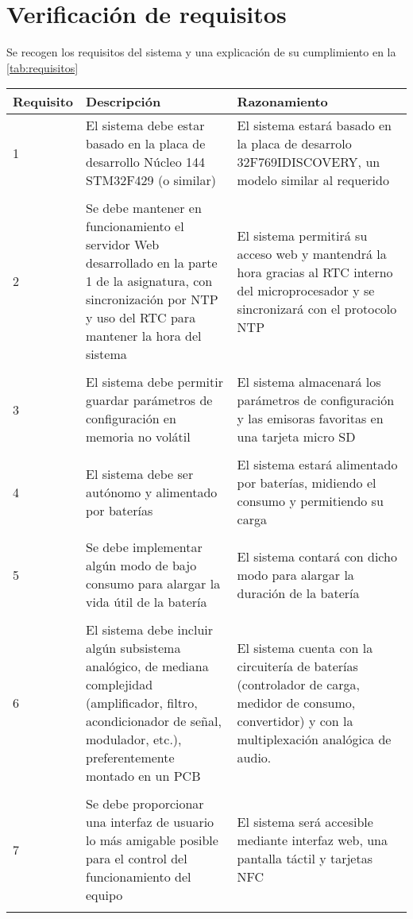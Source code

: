 \section{Verificación de requisitos}

Se recogen los requisitos del sistema y una explicación de su cumplimiento en la \autoref{tab:requisitos}

\begin{longtable}{l p{5cm} p{5cm}}
    \toprule
    \textbf{Requisito} & \textbf{Descripción} & \textbf{Razonamiento} \\ \midrule
    1 & El sistema debe estar basado en la placa de desarrollo Núcleo 144 STM32F429 (o similar) & El sistema estará basado en la placa de desarrolo 32F769IDISCOVERY, un modelo similar al requerido \\ \\
    2 & Se debe mantener en funcionamiento el servidor Web desarrollado en la parte 1 de la asignatura, con sincronización por NTP y uso del RTC para mantener la hora del sistema & El sistema permitirá su acceso web y mantendrá la hora gracias al RTC interno del microprocesador y se sincronizará con el protocolo NTP \\ \\
    3 & El sistema debe permitir guardar parámetros de configuración en memoria no volátil & El sistema almacenará los parámetros de configuración y las emisoras favoritas en una tarjeta micro SD \\ \\
    4 & El sistema debe ser autónomo y alimentado por baterías & El sistema estará alimentado por baterías, midiendo el consumo y permitiendo su carga \\ \\
    5 & Se debe implementar algún modo de bajo consumo para alargar la vida útil de la batería & El sistema contará con dicho modo para alargar la duración de la batería \\ \\
    6 & El sistema debe incluir algún subsistema analógico, de mediana complejidad (amplificador, filtro, acondicionador de señal, modulador, etc.), preferentemente montado en un PCB & El sistema cuenta con la circuitería de baterías (controlador de carga, medidor de consumo, convertidor) y con la multiplexación analógica de audio. \\ \\
    7 & Se debe proporcionar una interfaz de usuario lo más amigable posible para el control del funcionamiento del equipo & El sistema será accesible mediante interfaz web, una pantalla táctil y tarjetas NFC  \\ \\

\end{longtable}
